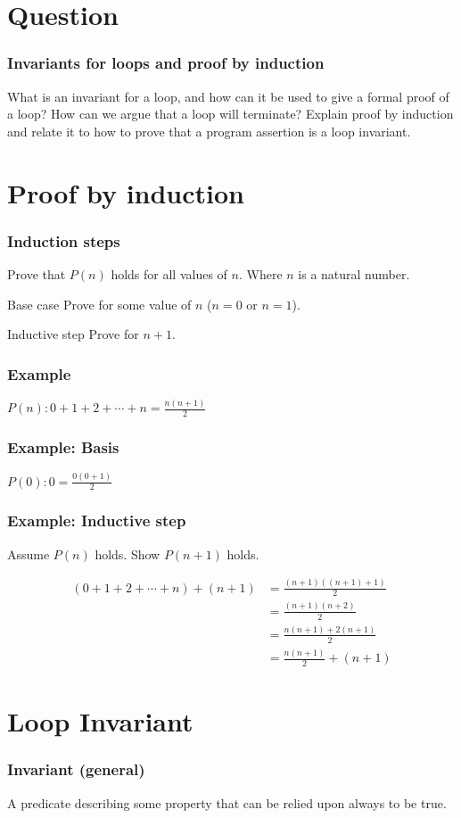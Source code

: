 
\section{Question}

\begin{frame}
    \frametitle{Invariants for loops and proof by induction}

    What is an invariant for a loop, and how can it be used to give a formal
    proof of a loop? How can we argue that a loop will terminate? Explain proof
    by induction and relate it to how to prove that a program assertion is a
    loop invariant.
\end{frame}

\section{Proof by induction}

\begin{frame}
    \frametitle{Induction steps}
    Prove that $P(n)$ holds for all values of $n$. Where $n$ is a natural
    number.
    \begin{block}{Base case}
        Prove for some value of $n$ ($n=0$ or $n=1$).
    \end{block}
    \begin{block}{Inductive step}
        Prove for $n+1$.
    \end{block}
\end{frame}

\begin{frame}
    \frametitle{Example}
    $P(n): 0 + 1 + 2 + \cdots + n = \frac{n(n + 1)}{2}$
\end{frame}

\begin{frame}
    \frametitle{Example: Basis}
    $P(0): 0 = \frac{0(0 + 1)}{2}$
\end{frame}

\begin{frame}
    \frametitle{Example: Inductive step}
    Assume $P(n)$ holds. Show $P(n+1)$ holds.

    \begin{align}
    (0 + 1 + 2 + \cdots + n )+ (n+1) & = \frac{(n+1)((n+1) + 1)}{2} \\
    & = \frac{(n+1)(n+2)}{2} \\
    & = \frac{n(n+1)+2(n+1)}{2} \\
    & = \frac{n(n + 1)}{2} + (n+1)
    \end{align}
\end{frame}

\section{Loop Invariant}

\begin{frame}
    \frametitle{Invariant (general)}
    A predicate describing some property that can be relied upon always to be
    true.
\end{frame}




